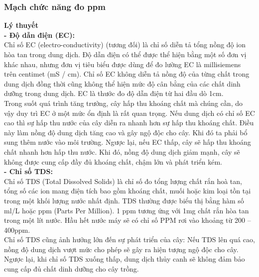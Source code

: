 \documentclass[a4paper,12pt,oneside]{article}
\begin{document}
\subsubsection{Mạch chức năng đo ppm}
\noindent \textbf{Lý thuyết}\\

\textbf{- Độ dẫn điện (EC):}\\
Chỉ số EC (electro-conductivity) (tương đối) là chỉ số diễn tả tổng nồng độ ion hòa tan trong dung dịch. Độ dẫn điện có thể được thể hiện bằng một số đơn vị khác nhau, nhưng đơn vị tiêu biểu được dùng để đo lường EC là millisiemens trên centimet (mS / cm). Chỉ số EC không diễn tả nồng độ của từng chất trong dung dịch đồng thời cũng không thể hiện mức độ cân bằng của các chất dinh dưỡng trong dung dịch. EC là thước đo độ dẫn điện từ hai đầu dò 1cm.\\
Trong suốt quá trình tăng trưởng, cây hấp thu khoáng chất mà chúng cần, do vậy duy trì EC ở một mức ổn định là rất quan trọng. Nếu dung dịch có chỉ số EC cao thì sự hấp thu nước của cây diễn ra nhanh hơn sự hấp thu khoáng chất. Điều này làm nồng độ dung dịch tăng cao và gây ngộ độc cho cây. Khi đó ta phải bổ sung thêm nước vào môi trường. Ngược lại, nếu EC thấp, cây sẽ hấp thu khoáng chất nhanh hơn hấp thu nước. Khi đó, nồng độ dung dịch giảm mạnh, cây sẽ không được cung cấp đầy đủ khoáng chất, chậm lớn và phát triển kém.\\

\textbf{- Chỉ số TDS:}\\
Chỉ số TDS (Total Dissolved Solids) là chỉ số đo tổng lượng chất rắn hoà tan, tổng số các ion mang điện tích bao gồm khoáng chất, muối hoặc kim loại tồn tại trong một khối lượng nước nhất định. TDS thường được biểu thị bằng hàm số ml/L hoặc ppm (Parts Per Million). 1 ppm tương ứng với 1mg chất rắn hòa tan trong một lít nước. Hầu hết nước máy sẽ có chỉ số PPM rơi vào khoảng từ 200 – 400ppm.\\
Chỉ số TDS cũng ảnh hưởng lớn đến sự phát triển của cây: Nếu TDS lên quá cao, nồng độ dung dịch vượt mức cho phép sẽ gây ra hiện tượng ngộ độc cho cây. Ngược lại, khi chỉ số TDS xuống thấp, dung dịch thủy canh sẽ không đảm bảo cung cấp đủ chất dinh dưỡng cho cây trồng.\\
\end{document}
